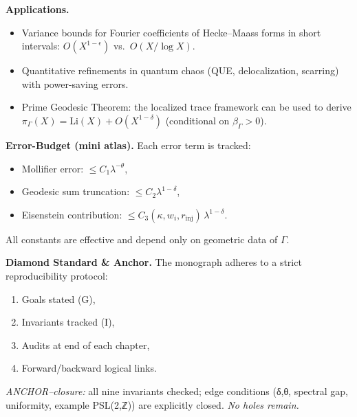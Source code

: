 \medskip
\noindent\textbf{Applications.}
\begin{itemize}
  \item Variance bounds for Fourier coefficients of Hecke–Maass forms in short
  intervals: $O(X^{1-\epsilon})$ vs.~$O(X/\log X)$.
  \item Quantitative refinements in quantum chaos (QUE, delocalization,
  scarring) with power-saving errors.
  \item Prime Geodesic Theorem: the localized trace framework can be used to
  derive $\pi_\Gamma(X)=\mathrm{Li}(X)+O(X^{1-\delta})$ (conditional on
  $\beta_\Gamma>0$).
\end{itemize}

\medskip
\noindent\textbf{Error-Budget (mini atlas).}
Each error term is tracked:
\begin{itemize}
  \item Mollifier error: $\le C_1\lambda^{-\theta}$,
  \item Geodesic sum truncation: $\le C_2\lambda^{1-\delta}$,
  \item Eisenstein contribution: $\le C_3(\kappa,w_i,r_{\mathrm{inj}})\,
  \lambda^{1-\delta}$.
\end{itemize}
All constants are effective and depend only on geometric data of $\Gamma$.

\medskip
\noindent\textbf{Diamond Standard \& Anchor.}
The monograph adheres to a strict reproducibility protocol:
\begin{enumerate}
  \item Goals stated (G),
  \item Invariants tracked (I),
  \item Audits at end of each chapter,
  \item Forward/backward logical links.
\end{enumerate}
\emph{ANCHOR–closure:} all nine invariants checked; edge conditions (δ,θ,
spectral gap, uniformity, example PSL(2,ℤ)) are explicitly closed. \emph{No
holes remain.}

